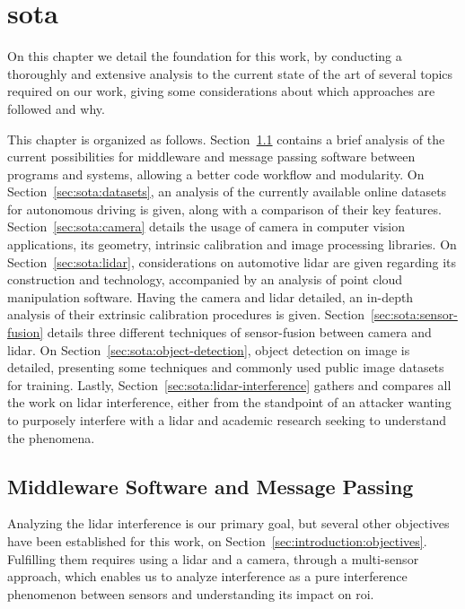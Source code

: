 \chapter{\acl{sota}}
\label{chapter:sota}
On this chapter we detail the foundation for this work, by conducting a thoroughly and extensive analysis to the current state of the art of several topics required on our work, giving some considerations about which approaches are followed and why.

This chapter is organized as follows. Section~\ref{sec:sota:software-middleware} contains a brief analysis of the current possibilities for middleware and message passing software between programs and systems, allowing a better code workflow and modularity. On Section~\ref{sec:sota:datasets}, an analysis of the currently available online datasets for autonomous driving is given, along with a comparison of their key features. Section~\ref{sec:sota:camera} details the usage of camera in computer vision applications, its geometry, intrinsic calibration and image processing libraries. On Section~\ref{sec:sota:lidar}, considerations on automotive \ac{lidar} are given regarding its construction and technology, accompanied by an analysis of point cloud manipulation software. Having the camera and \ac{lidar} detailed, an in-depth analysis of their extrinsic calibration procedures is given. Section~\ref{sec:sota:sensor-fusion} details three different techniques of sensor-fusion between camera and \ac{lidar}. On Section~\ref{sec:sota:object-detection}, object detection on image is detailed, presenting some techniques and commonly used  public image datasets for training. Lastly, Section~\ref{sec:sota:lidar-interference} gathers and compares all the work on \ac{lidar} interference, either from the standpoint of an attacker wanting to purposely interfere with a \ac{lidar} and academic research seeking to understand the phenomena.


\section{Middleware Software and Message Passing}
\label{sec:sota:software-middleware}
Analyzing the \ac{lidar} interference is our primary goal, but several other objectives have been established for this work, on Section~\ref{sec:introduction:objectives}. Fulfilling them requires using a \ac{lidar} and a camera, through a multi-sensor approach, which enables us to analyze interference as a pure interference phenomenon between sensors and understanding its impact on \ac{roi}.


